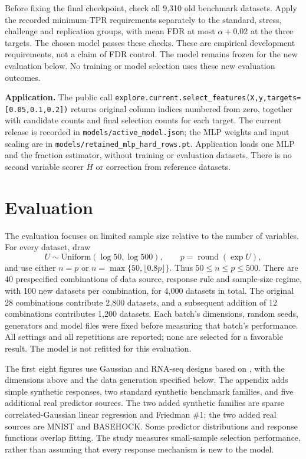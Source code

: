 \documentclass[10pt,letterpaper]{article}
\newcommand{\code}[1]{\nolinkurl{#1}}
\begin{document}
Before fixing the final checkpoint, check all 9,310 old benchmark datasets.
Apply the recorded minimum-TPR requirements separately to the standard,
stress, challenge and replication groups, with mean FDR at most
$\alpha+0.02$ at the three targets. The chosen model passes these checks.
These are empirical development requirements, not a claim of FDR control.
The model remains frozen for the new evaluation below. No training or
model selection uses these new evaluation outcomes.

\textbf{Application.} The public call
\code{explore.current.select_features(X,y,targets=[0.05,0.1,0.2])}
returns original column indices numbered from zero, together with
candidate counts and final selection counts for each target.
The current release is recorded in \code{models/active_model.json};
the MLP weights and input scaling are in
\code{models/retained_mlp_hard_rows.pt}. Application loads one MLP and
the fraction estimator, without training or evaluation datasets.
There is no second variable scorer $H$ or correction from reference datasets.






\section{Evaluation}\label{sec:experiments}
The evaluation focuses on limited sample size relative to the number of variables.
For every dataset, draw
\[
 U\sim\mathrm{Uniform}(\log50,\log500),\qquad
 p=\operatorname{round}(\exp U),
\]
and use either $n=p$ or $n=\max\{50,\lfloor0.8p\rfloor\}$.
Thus $50\le n\le p\le500$. There are 40 prespecified combinations of
data source, response rule and sample-size regime, with 100 new datasets
per combination, for 4,000 datasets in total. The original 28 combinations
contribute 2,800 datasets, and a subsequent addition of 12 combinations
contributes 1,200 datasets. Each batch's dimensions, random seeds,
generators and model files were fixed before measuring that batch's performance.
All settings and all repetitions are reported; none are selected for a
favorable result. The model is not refitted for this evaluation.

The first eight figures use Gaussian and RNA-seq designs based on
\cite{ipssgb}, with the dimensions above and the data generation specified
below. The appendix adds
simple synthetic responses, two standard synthetic benchmark families,
and five additional real predictor sources. The two added synthetic
families are sparse correlated-Gaussian linear regression and Friedman \#1;
the two added real sources are MNIST and BASEHOCK.
Some predictor distributions and response functions overlap fitting.
The study measures small-sample selection performance, rather than
assuming that every response mechanism is new to the model.
\end{document}
